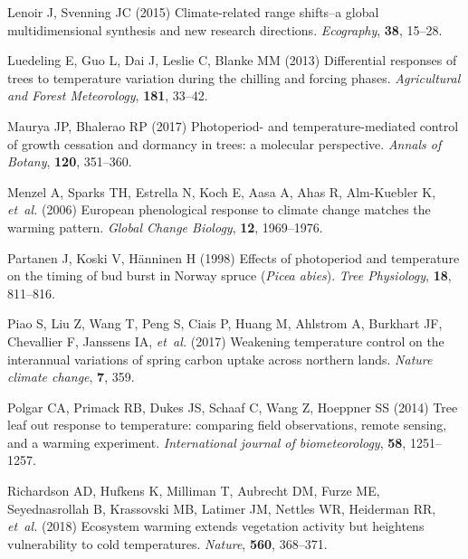 \documentclass[11pt,letter]{article}
\begin{document}
\begin{thebibliography}{63}
Lenoir J, Svenning JC (2015) Climate-related range shifts--a global
  multidimensional synthesis and new research directions.
\newblock \emph{Ecography}, \textbf{38}, 15--28.

Luedeling E, Guo L, Dai J, Leslie C, Blanke MM (2013) Differential responses of
  trees to temperature variation during the chilling and forcing phases.
\newblock \emph{Agricultural and Forest Meteorology}, \textbf{181}, 33--42.

Maurya JP, Bhalerao RP (2017) Photoperiod- and temperature-mediated control of
  growth cessation and dormancy in trees: a molecular perspective.
\newblock \emph{Annals of Botany}, \textbf{120}, 351--360.

Menzel A, Sparks TH, Estrella N, Koch E, Aasa A, Ahas R, Alm-Kuebler K,
  \emph{et~al.} (2006) European phenological response to climate change matches
  the warming pattern.
\newblock \emph{Global Change Biology}, \textbf{12}, 1969--1976.

Partanen J, Koski V, H{\"a}nninen H (1998) {Effects of photoperiod and
  temperature on the timing of bud burst in Norway spruce (\emph{Picea
  abies})}.
\newblock \emph{Tree Physiology}, \textbf{18}, 811--816.

Piao S, Liu Z, Wang T, Peng S, Ciais P, Huang M, Ahlstrom A, Burkhart JF,
  Chevallier F, Janssens IA, \emph{et~al.} (2017) Weakening temperature control
  on the interannual variations of spring carbon uptake across northern lands.
\newblock \emph{Nature climate change}, \textbf{7}, 359.

Polgar CA, Primack RB, Dukes JS, Schaaf C, Wang Z, Hoeppner SS (2014) Tree leaf
  out response to temperature: comparing field observations, remote sensing,
  and a warming experiment.
\newblock \emph{International journal of biometeorology}, \textbf{58},
  1251--1257.

Richardson AD, Hufkens K, Milliman T, Aubrecht DM, Furze ME, Seyednasrollah B,
  Krassovski MB, Latimer JM, Nettles WR, Heiderman RR, \emph{et~al.} (2018)
  Ecosystem warming extends vegetation activity but heightens vulnerability to
  cold temperatures.
\newblock \emph{Nature}, \textbf{560}, 368--371.


\end{thebibliography}
\end{document}
